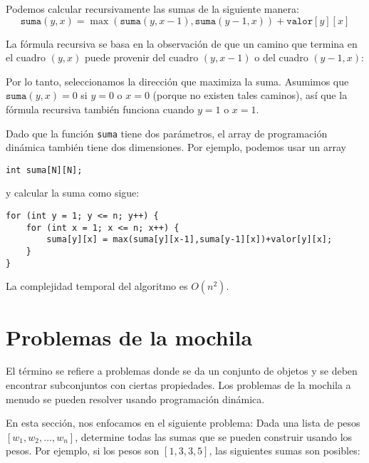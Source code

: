 Podemos calcular recursivamente las sumas
de la siguiente manera:
\[ \texttt{suma}(y,x) = \max(\texttt{suma}(y,x-1),\texttt{suma}(y-1,x))+\texttt{valor}[y][x]\]

La fórmula recursiva se basa en la observación
de que un camino que termina en el cuadro $(y,x)$
puede provenir del cuadro $(y,x-1)$
o del cuadro $(y-1,x)$:
\begin{center}
\end{center}

Por lo tanto, seleccionamos la dirección que maximiza
la suma.
Asumimos que $\texttt{suma}(y,x)=0$
si $y=0$ o $x=0$ (porque no existen tales caminos),
así que la fórmula recursiva también funciona cuando $y=1$ o $x=1$.

Dado que la función \texttt{suma} tiene dos parámetros,
el array de programación dinámica también tiene dos dimensiones.
Por ejemplo, podemos usar un array
\begin{lstlisting}
int suma[N][N];
\end{lstlisting}
y calcular la suma como sigue:
\begin{lstlisting}
for (int y = 1; y <= n; y++) {
    for (int x = 1; x <= n; x++) {
        suma[y][x] = max(suma[y][x-1],suma[y-1][x])+valor[y][x];
    }
}
\end{lstlisting}
La complejidad temporal del algoritmo es $O(n^2)$.

\section{Problemas de la mochila}


El término  se refiere a problemas donde
se da un conjunto de objetos y
se deben encontrar subconjuntos con ciertas propiedades.
Los problemas de la mochila a menudo se pueden resolver
usando programación dinámica.

En esta sección, nos enfocamos en el siguiente
problema: Dada una lista de pesos
$[w_1,w_2,\ldots,w_n]$,
determine todas
las sumas que se pueden construir usando los pesos.
Por ejemplo, si los pesos son
$[1,3,3,5]$, las siguientes sumas son posibles:

